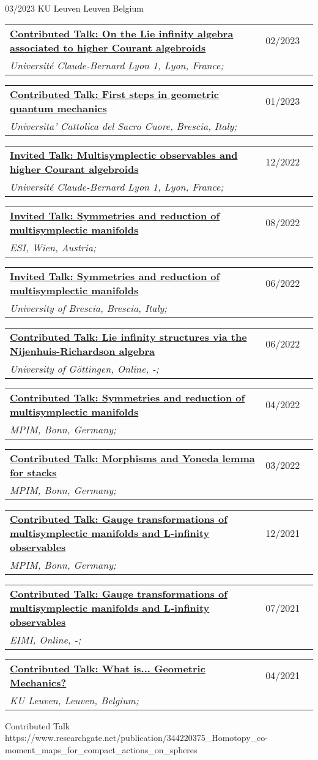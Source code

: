 \documentclass[a4paper]{article}
\newcommand{\longvoice}[8]{
	\begin{tabular}{p{0.83\linewidth} p{0.17\linewidth} }
		\textbf{\href{#3}{#2: #1}} & #4 
		\\ 
		\textit{#5, #6, #7;} & {\small\emph{#8}}
	\end{tabular}
	\vspace{.5em}
}
\begin{document}
		{03/2023}
		{KU Leuven}
		{Leuven}
		{Belgium}
		{}
	\longvoice{On the Lie infinity algebra associated to higher Courant algebroids}
		{Contributed Talk}
		{https://www.dropbox.com/s/whusmg6kj8dbqd7/2302-Lyon-HigherGeoWorkgroup.pdf?dl=0}
		{02/2023}
		{Université Claude-Bernard Lyon 1}
		{Lyon}
		{France}
		{}
	\longvoice{First steps in geometric quantum mechanics}
		{Contributed Talk}
		{https://www.dropbox.com/s/oqd6psmeiexwhnt/2301-Brescia-PhdSeminar.pdf?dl=0}
		{01/2023}
		{Universita' Cattolica del Sacro Cuore}
		{Brescia}
		{Italy}
		{}
	\longvoice{Multisymplectic observables and higher Courant algebroids}
		{Invited Talk}
		{https://indico.math.cnrs.fr/event/8621/}
		{12/2022}
		{Université Claude-Bernard Lyon 1}
		{Lyon}
		{France}
		{}
	\longvoice{Symmetries and reduction of multisymplectic manifolds}
		{Invited Talk}
		{https://www.esi.ac.at/events/t1028/}
		{08/2022}
		{ESI}
		{Wien}
		{Austria}
		{}
	\longvoice{Symmetries and reduction of multisymplectic manifolds}
		{Invited Talk}
		{https://www.dropbox.com/s/2elzcczx7m0o9zf/2206-Brescia-YoungPeople4Math.pdf?dl=0}
		{06/2022}
		{University of Brescia}
		{Brescia}
		{Italy}
		{}
	\longvoice{Lie infinity structures via the Nijenhuis-Richardson algebra}
		{Contributed Talk}
		{https://www.dropbox.com/s/lq862vynwme0eyn/2206-Online-GoodMorningSfars.pdf?dl=0}
		{06/2022}
		{University of Göttingen}
		{Online}
		{-}
		{}
	\longvoice{Symmetries and reduction of multisymplectic manifolds}
		{Contributed Talk}
		{https://www.mpim-bonn.mpg.de/node/11285}
		{04/2022}
		{MPIM}
		{Bonn}
		{Germany}
		{}
	\longvoice{Morphisms and Yoneda lemma for stacks}
		{Contributed Talk}
		{https://www.dropbox.com/s/rfu7cw1plq0wpzb/2203-Bonn-StackMorphisms.pdf?dl=0}
		{03/2022}
		{MPIM}
		{Bonn}
		{Germany}
		{}
	\longvoice{Gauge transformations of multisymplectic manifolds and L-infinity observables}
		{Contributed Talk}
		{https://www.dropbox.com/s/x267gvrge9xghq1/2112-Bonn-HigherSeminar.pdf?dl=0}
		{12/2021}
		{MPIM}
		{Bonn}
		{Germany}
		{}
	\longvoice{Gauge transformations of multisymplectic manifolds and L-infinity observables}
		{Contributed Talk}
		{https://www.researchgate.net/publication/353463068_Gauge_transformations_of_multisymplectic_manifolds_and_L_observables}
		{07/2021}
		{EIMI}
		{Online}
		{-}
		{}
	\longvoice{What is... Geometric Mechanics?}
		{Contributed Talk}
		{https://wis.kuleuven.be/agenda/PhdColloquia/ay20-21/copy4_of_PhD-coll-Molag}
		{04/2021}
		{KU Leuven}
		{Leuven}
		{Belgium}
		{}
		{Contributed Talk}
		{https://www.researchgate.net/publication/344220375_Homotopy_co-moment_maps_for_compact_actions_on_spheres}
\end{document}

